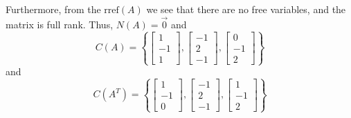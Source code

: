 \begin{mdframed}[style=MyFrame]
    Furthermore, from the $\text{rref}(A)$ we see that there are no free
    variables, and the matrix is full rank. Thus, $N(A) = \vec{0}$ and
    \begin{equation}
        C(A) =
        \left\{
            \begin{bmatrix}
                1   \\
                -1  \\
                1   
            \end{bmatrix}, 
            \begin{bmatrix}
                -1   \\
                2    \\
                -1   
            \end{bmatrix},
            \begin{bmatrix}
                0   \\
                -1  \\
                2   
            \end{bmatrix}
           \right\}
    \end{equation}
    and 
    \begin{equation}
        C\left(A^{T}\right) =
        \left\{
            \begin{bmatrix}
                1   \\
                -1  \\
                0   
            \end{bmatrix},
            \begin{bmatrix}
                -1   \\
                2    \\
                -1   
            \end{bmatrix},
            \begin{bmatrix}
                1   \\
                -1  \\
                2   
            \end{bmatrix}
           \right\}
    \end{equation}
\end{mdframed}

